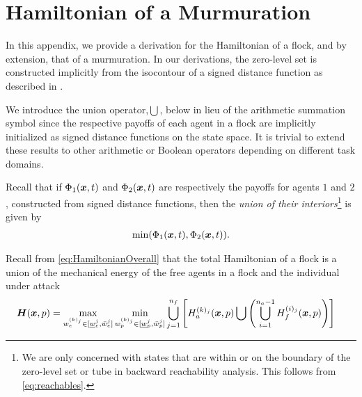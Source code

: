 \section{Hamiltonian of a Murmuration}
\label{app:ham}

In this appendix, we provide a derivation for the Hamiltonian of a flock, and by extension, that of a murmuration. In our derivations, the zero-level set is constructed implicitly from the  isocontour of a signed distance function as described in \cite[Chapter II]{LevelSetsBook}. 

We introduce the union operator,$\bigcup$, below in lieu of the arithmetic summation symbol since the respective payoffs of each agent in a flock are implicitly initialized as signed distance functions on the state space. It is trivial to extend these results to other arithmetic or Boolean operators depending on different task domains. 

Recall that if $\Phi_1(\bm{x}, t)$ and $\Phi_2(\bm{x}, t)$ are respectively the payoffs for agents $1$ and $2$, constructed from signed distance functions, then the \textit{union of their interiors}\footnote{We are only concerned with states that are within or on the boundary of the zero-level set or tube in backward reachability analysis. This follows from \eqref{eq:reachables}.} is given by 
%
\begin{align}
	\min(\Phi_1(\bm{x}, t), \Phi_2(\bm{x}, t)).
\end{align}
%

Recall from \eqref{eq:HamiltonianOverall} 
that the total Hamiltonian of a flock is a union of the mechanical energy of the free agents in a flock and the individual under attack \ie
%
\begin{align}
	\bm{H}(\bm{x}, p) &= \max_{w_e^{(k)_j} \in [\underline{w}_e^j, \bar{w}_e^j]}  \min_{w_p^{(k)_j}  \in [\underline{w}_p^{j}, \bar{w}_p^j]} \bigcup_{j=1}^{n_f} \left[ H^{(k)_j}_a(\bm{x}, p) \bigcup \left( \bigcup_{i=1}^{n_a-1} H^{(i)_j}_f(\bm{x}, p) \right) \right] 
\end{align}

